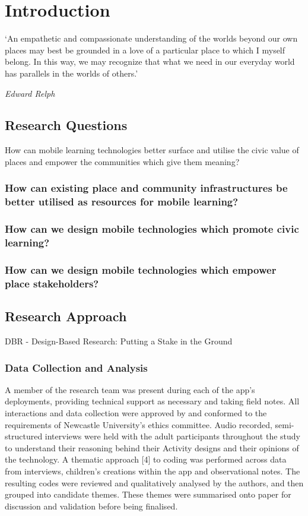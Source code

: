 \chapter{Introduction}

\epigraph{`An empathetic and compassionate understanding of the worlds beyond our own places may best be grounded in a love of a particular place to which I myself belong. In this way, we may recognize that what we need in our everyday world has parallels in the worlds of others.'}{\textit{Edward Relph}}

\section{Research Questions}

How can mobile learning technologies better surface and utilise the civic value of places and empower the communities which give them meaning?

\subsection*{How can existing place and community infrastructures be better utilised as resources for mobile learning?}

\subsection*{How can we design mobile technologies which promote civic learning?}

\subsection*{How can we design mobile technologies which empower place stakeholders?}

\section{Research Approach}
\label{sec:ResearchApproach}

DBR - Design-Based Research: Putting a Stake in the Ground

\subsection{Data Collection and Analysis}

A member of the research team was present during each of the app’s deployments, providing technical support as necessary and taking field notes. All interactions and data collection were approved by and conformed to the requirements of Newcastle University’s ethics committee. Audio recorded, semi-structured interviews were held with the adult participants throughout the study to understand their reasoning behind their Activity designs and their opinions of the technology. A thematic approach [4] to coding was performed across data from interviews, children’s creations within the app and observational notes. The resulting codes were reviewed and qualitatively analysed by the authors, and then grouped into candidate themes. These themes were summarised onto paper for discussion and validation before being finalised.

